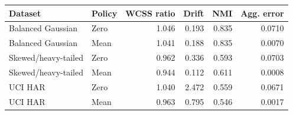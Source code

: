\begin{tabular}{llrrrr}
\toprule
Dataset & Policy & WCSS ratio & Drift & NMI & Agg. error \\
\midrule
Balanced Gaussian & Zero & 1.046 & 0.193 & 0.835 & 0.0710 \\
Balanced Gaussian & Mean & 1.041 & 0.188 & 0.835 & 0.0070 \\
Skewed/heavy-tailed & Zero & 0.962 & 0.336 & 0.593 & 0.0703 \\
Skewed/heavy-tailed & Mean & 0.944 & 0.112 & 0.611 & 0.0008 \\
UCI HAR & Zero & 1.040 & 2.472 & 0.559 & 0.0671 \\
UCI HAR & Mean & 0.963 & 0.795 & 0.546 & 0.0017 \\
\bottomrule
\end{tabular}
